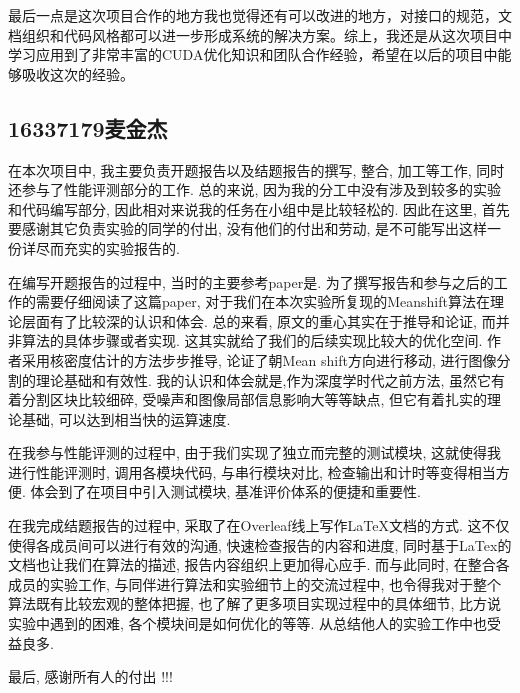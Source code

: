 \documentclass[a4paper, 11pt]{article}
\begin{document}
最后一点是这次项目合作的地方我也觉得还有可以改进的地方，对接口的规范，文档组织和代码风格都可以进一步形成系统的解决方案。综上，我还是从这次项目中学习应用到了非常丰富的CUDA优化知识和团队合作经验，希望在以后的项目中能够吸收这次的经验。

\subsection{16337179麦金杰}
在本次项目中, 我主要负责开题报告以及结题报告的撰写, 整合, 加工等工作, 同时还参与了性能评测部分的工作. 总的来说, 因为我的分工中没有涉及到较多的实验和代码编写部分,
因此相对来说我的任务在小组中是比较轻松的. 因此在这里, 首先要感谢其它负责实验的同学的付出, 没有他们的付出和劳动, 是不可能写出这样一份详尽而充实的实验报告的.

在编写开题报告的过程中, 当时的主要参考paper是\cite{comaniciu2002mean}. 为了撰写报告和参与之后的工作的需要仔细阅读了这篇paper, 对于我们在本次实验所复现的Meanshift算法在理论层面有了比较深的认识和体会. 总的来看, 原文的重心其实在于推导和论证, 而并非算法的具体步骤或者实现. 这其实就给了我们的后续实现比较大的优化空间.  作者采用核密度估计的方法步步推导, 论证了朝Mean shift方向进行移动, 进行图像分割的理论基础和有效性. 我的认识和体会就是,作为深度学时代之前方法, 虽然它有着分割区块比较细碎, 受噪声和图像局部信息影响大等等缺点, 但它有着扎实的理论基础, 可以达到相当快的运算速度.

在我参与性能评测的过程中, 由于我们实现了独立而完整的测试模块, 这就使得我进行性能评测时, 调用各模块代码, 与串行模块对比, 检查输出和计时等变得相当方便. 体会到了在项目中引入测试模块, 基准评价体系的便捷和重要性.

在我完成结题报告的过程中, 采取了在Overleaf线上写作\LaTeX 文档的方式. 这不仅使得各成员间可以进行有效的沟通, 快速检查报告的内容和进度, 
同时基于LaTex的文档也让我们在算法的描述, 报告内容组织上更加得心应手. 而与此同时, 在整合各成员的实验工作, 与同伴进行算法和实验细节上的交流过程中, 也令得我对于整个算法既有比较宏观的整体把握, 也了解了更多项目实现过程中的具体细节, 比方说实验中遇到的困难, 各个模块间是如何优化的等等. 从总结他人的实验工作中也受益良多.

最后, 感谢所有人的付出 !!!
\end{document}
